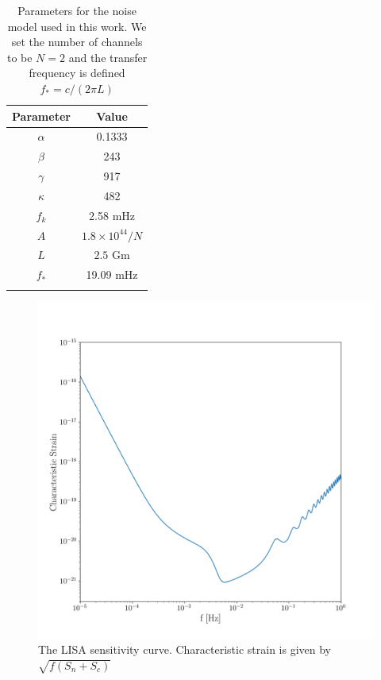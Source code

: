 \documentclass[a4paper,fleqn,usenatbib]{mnras}
\begin{document}
\begin{table}
	\centering
	\begin{tabular}{cc}
		\noalign{\smallskip} \hline \hline \noalign{\smallskip}
		Parameter & Value \\
		\hline
		$\alpha$ & 0.1333 \\
		$\beta$ & 243 \\
		$\gamma$ & 917 \\
		$\kappa$ & 482 \\
		$f_k$ & 2.58 mHz \\
		$A$ & $1.8 \times 10^{44} / N$ \\
		$L$ & $2.5$ Gm \\
		$f_*$ & 19.09 mHz\\
		\noalign{\smallskip} \hline \noalign{\smallskip}
	\end{tabular}
	\caption{Parameters for the noise model used in this work. We set the number of channels to be $N=2$ and the transfer frequency is defined $f_* = c/(2\pi L)$}
	\label{t:parameters}
\end{table}

\begin{figure}
	\includegraphics[width=\columnwidth]{LISANoise.png}
	\caption{The LISA sensitivity curve. Characteristic strain is given by $\sqrt{f (S_n + S_c)}$ }
	\label{fig:LISA_NOISE}
\end{figure}
\end{document}
